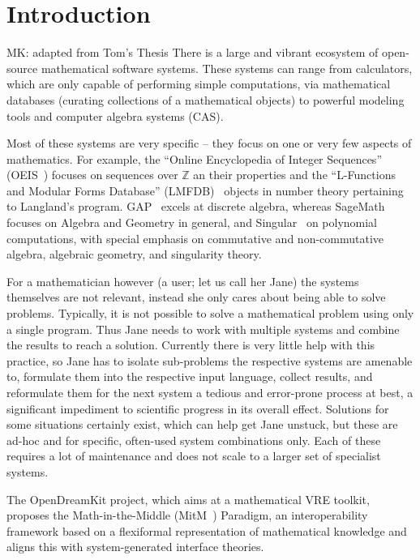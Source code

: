 \section{Introduction}\label{sec:intro}

\begin{newpart}{MK: adapted from Tom's Thesis}
There is a large and vibrant ecosystem of open-source mathematical software systems.
These systems can range from calculators, which are only capable of performing simple
computations, via mathematical databases (curating collections of a mathematical objects)
to powerful modeling tools and computer algebra systems (CAS). 

Most of these systems are very specific -- they focus on one or very few aspects of
mathematics.  For example, the ``Online Encyclopedia of Integer Sequences''
(OEIS~\cite{Sloane:oeis12,oeis}) focuses on sequences over $\mathbb{Z}$ an their
properties and the ``L-Functions and Modular Forms Database''
(LMFDB)~\cite{Cremona:LMFDB16,lmfdb:on} objects in number theory pertaining to Langland's
program.  GAP~\cite{GAP:on} excels at discrete algebra, whereas
SageMath~\cite{SageMath:on} focuses on Algebra and Geometry in general, and
Singular~\cite{singular:on} on polynomial computations, with special emphasis on
commutative and non-commutative algebra, algebraic geometry, and singularity theory.

For a mathematician however (a user; let us call her Jane) the systems themselves are not relevant, instead she only cares about being able to solve problems. 
Typically, it is not possible to solve a mathematical problem using only a single program. 
Thus Jane needs to work with multiple systems and combine the results to reach a solution. 
Currently there is very little help with this practice, so Jane has to isolate sub-problems the respective systems are amenable to, formulate them into the respective input language, collect results, and reformulate them for the next system a tedious and error-prone process at best, a significant impediment to scientific progress in its overall effect. 
Solutions for some situations certainly exist, which can help get Jane unstuck, but these are ad-hoc and for specific, often-used system combinations only. 
Each of these requires a lot of maintenance and does not scale to a larger set of specialist systems. 

The OpenDreamKit project, which aims at a mathematical VRE toolkit, proposes the Math-in-the-Middle (MitM~\cite{DehKohKon:iop16}) Paradigm, an interoperability framework based on a flexiformal
representation of mathematical knowledge and aligns this with system-generated interface
theories. 


\end{newpart}
